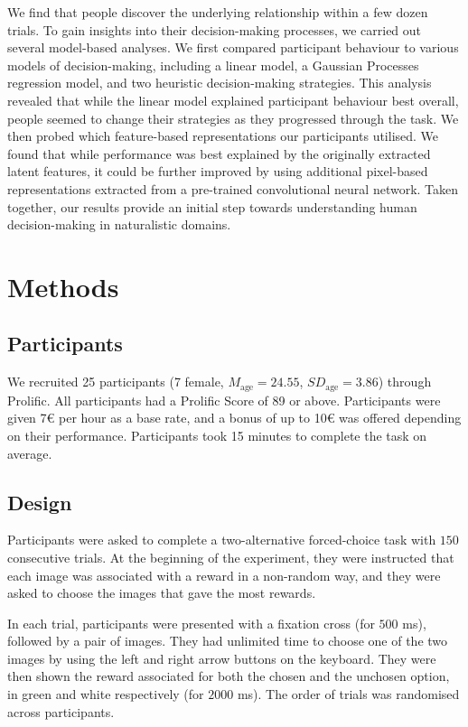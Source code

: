 \documentclass[10pt]{article}
\begin{document}
We find that people discover the underlying relationship within a few dozen trials. To gain insights into their decision-making processes, we carried out several model-based analyses. We first compared participant behaviour to various models of decision-making, including a linear model, a Gaussian Processes regression model, and two heuristic decision-making strategies. This analysis revealed that while the linear model explained participant behaviour best overall, people seemed to change their strategies as they progressed through the task. We then probed which feature-based representations our participants utilised. We found that while performance was best explained by the originally extracted latent features, it could be further improved by using additional pixel-based representations extracted from a pre-trained convolutional neural network. Taken together, our results provide an initial step towards understanding human decision-making in naturalistic domains.


\section{Methods}

\subsection{Participants}
We recruited 25 participants (7 female, $M_{\text{age}} = 24.55$, $SD_{\text{age}} = 3.86$) through Prolific. All participants had a Prolific Score of 89 or above. Participants were given 7€ per hour as a base rate, and a bonus of up to 10€ was offered depending on their performance. Participants took 15 minutes to complete the task on average. 

\subsection{Design}
Participants were asked to complete a two-alternative forced-choice task with $150$ consecutive trials. At the beginning of the experiment, they were instructed that each image was associated with a reward in a non-random way, and they were asked to choose the images that gave the most rewards.

In each trial, participants were presented with a fixation cross (for $500$ ms), followed by a pair of images. They had unlimited time to choose one of the two images by using the left and right arrow buttons on the keyboard. They were then shown the reward associated for both the chosen and the unchosen option, in green and white respectively (for $2000$ ms). The order of trials was randomised across participants.
\end{document}
